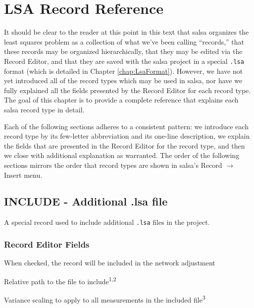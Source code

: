 \chapter{LSA Record Reference}
\label{chap:LsaRecordGuide}

It should be clear to the reader at this point in this text that \textsf{salsa} organizes the least squares problem as a collection of what we've been calling ``records,'' that these records may be organized hierarchically, that they may be edited via the Record Editor, and that they are saved with the \textsf{salsa} project in a special \verb+.lsa+ format (which is detailed in Chapter \ref{chap:LsaFormat}).  However, we have not yet introduced all of the record types which may be used in \textsf{salsa}, nor have we fully explained all the fields presented by the Record Editor for each record type.  The goal of this chapter is to provide a complete reference that explains each \textsf{salsa} record type in detail.


Each of the following sections adheres to a consistent pattern: we introduce each record type by its few-letter abbreviation and its one-line description, we explain the fields that are presented in the Record Editor for the record type, and then we close with additional explanation as warranted.  The order of the following sections mirrors the order that record types are shown in \textsf{salsa}'s Record $\to$ Insert menu.


\newpage
\section{INCLUDE - Additional .lsa file}

A special record used to include additional \verb+.lsa+ files in the project.

\subsection*{Record Editor Fields}

\begin{description}[leftmargin=!,labelwidth=\widthof{\bfseries Enabled:}]
\item[Enabled:] When checked, the record will be included in the network adjustment
\item[File:] Relative path to the file to include\textsuperscript{1,2}
\item[Scaling:] Variance scaling to apply to all measurements in the included file\textsuperscript{3}
\end{description}

